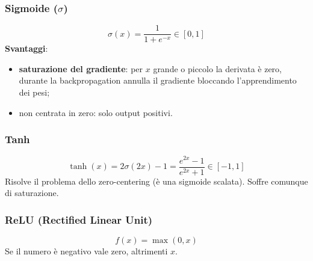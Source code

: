 \documentclass[11pt,a4paper]{article}
\begin{document}
\subsubsection{Sigmoide ($\sigma$)}
\[
\sigma(x) = \frac{1}{1+e^{-x}} \in [0,1]
\]
\textbf{Svantaggi}:
\begin{itemize}
  \item \textbf{saturazione del gradiente}: per $x$ grande o piccolo la derivata è zero, durante la backpropagation annulla il gradiente bloccando l'apprendimento dei pesi;
  \item non centrata in zero: solo output positivi.
\end{itemize}


\begin{center}
\end{center}

\subsubsection{Tanh}
\[
\tanh(x) = 2\sigma(2x) - 1 = \frac{e^{2x}-1}{e^{2x}+1} \in [-1,1]
\]
Risolve il problema dello zero-centering (è una sigmoide scalata). Soffre comunque di saturazione.

\begin{center}
\end{center}

\subsubsection{ReLU (Rectified Linear Unit)}
\[
f(x) = \max(0,x)
\]
Se il numero è negativo vale zero, altrimenti $x$.
\end{document}
